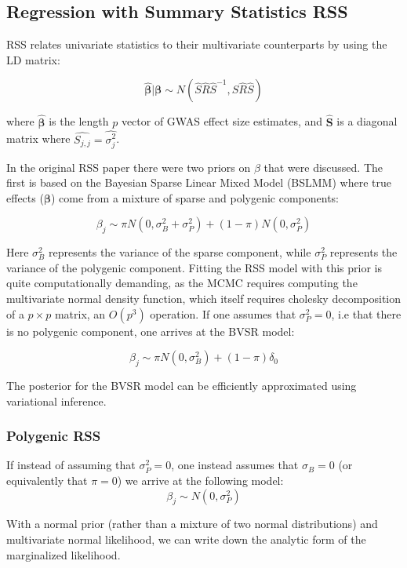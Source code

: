 {\subsection{Regression with Summary Statistics RSS}\label{sec:orgb0b15e2}

RSS relates univariate statistics to their multivariate counterparts by using the LD matrix:

$$ \hat{\boldsymbol{\beta}} | \boldsymbol{\beta} \sim N(\hat{S}\hat{R}\hat{S}^{-1},\hat{S}\hat{R}\hat{S}) $$

where \(\hat{\boldsymbol{\beta}}\) is the length $p$ vector of GWAS effect size estimates, and $\hat{\textbf{S}}$ is a diagonal matrix where $\hat{S_{j,j}}=\hat{\sigma_j^2}$.

In the original RSS paper there were two priors on \(\beta\) that were discussed.  The first is based on the Bayesian Sparse Linear Mixed Model (BSLMM) \cite{bslmm} where true effects ($\boldsymbol{\beta}$)
come from a mixture of sparse and polygenic components:

$$ \beta_j \sim \pi N(0,\sigma^2_B+\sigma^2_P)+(1-\pi) N(0,\sigma^2_P) $$

Here \(\sigma^2_B\) represents the variance of the sparse component, while \(\sigma^2_P\) represents the variance of the polygenic component. Fitting the RSS model with this prior is quite computationally demanding, 
as the MCMC requires computing the multivariate normal density function, which itself requires cholesky decomposition of a \(p \times p\) matrix, an \(O(p^3)\) operation.  If one assumes that \(\sigma^2_P=0\),
i.e that there is no polygenic component, one arrives at the BVSR model:

$$ \beta_j \sim \pi N(0,\sigma^2_B)+(1-\pi) \delta_0 $$

The posterior for the BVSR model can be efficiently approximated using variational inference. 

\subsubsection{Polygenic RSS}\label{sec:org040cb73}

If instead of assuming that \(\sigma^2_P=0\), one instead assumes that \(\sigma_B=0\) (or equivalently that \(\pi=0\)) we arrive at the following model: 
$$ \beta_j \sim N(0,\sigma^2_P)$$

With a normal prior (rather than a mixture of two normal distributions) and multivariate normal likelihood, we can write down the analytic form of the marginalized likelihood\cite{patternrecognition}.

}
